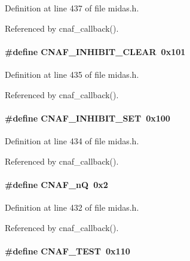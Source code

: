Definition at line 437 of file midas.h.

Referenced by cnaf\_\-callback().
\paragraph[{CNAF\_\-INHIBIT\_\-CLEAR}]{\setlength{\rightskip}{0pt plus 5cm}\#define CNAF\_\-INHIBIT\_\-CLEAR~0x101}\hfill\label{group__midasincludecode_gafe3467b124db26b5b10caf7f1633baed}


Definition at line 435 of file midas.h.

Referenced by cnaf\_\-callback().
\paragraph[{CNAF\_\-INHIBIT\_\-SET}]{\setlength{\rightskip}{0pt plus 5cm}\#define CNAF\_\-INHIBIT\_\-SET~0x100}\hfill\label{group__midasincludecode_ga5034a4dfe61df0821dd0841bae13033a}


Definition at line 434 of file midas.h.

Referenced by cnaf\_\-callback().
\paragraph[{CNAF\_\-nQ}]{\setlength{\rightskip}{0pt plus 5cm}\#define CNAF\_\-nQ~0x2}\hfill\label{group__midasincludecode_gad36f02a80cebab2bdfa9795db23ef333}


Definition at line 432 of file midas.h.

Referenced by cnaf\_\-callback().
\paragraph[{CNAF\_\-TEST}]{\setlength{\rightskip}{0pt plus 5cm}\#define CNAF\_\-TEST~0x110}\hfill\label{group__midasincludecode_ga6e256f90162b33b043f023b270ddfad9}


